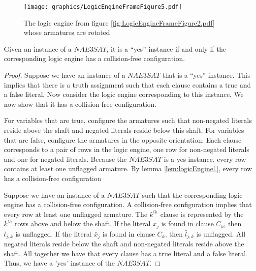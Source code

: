 \begin{figure}[!htbp]
\begin{center}
\texttt{[image: graphics/LogicEngineFrameFigure5.pdf]}
\caption{The logic engine from figure \ref{fig:LogicEngineFrameFigure2.pdf} whose armatures are rotated}\label{fig:LogicEngineFrameFigure5.pdf}
\end{center}
\end{figure}
\begin{thm}\label{thm:Satisfiability-1}
 Given an instance of a $NAE3SAT$,  it is a ``yes'' instance if and only if the 
corresponding logic engine has a collision-free configuration.
\end{thm}
\begin{proof}
Suppose we have an instance of a $NAE3SAT$ that is a ``yes'' instance. This implies that there is a 
truth assignment such that each clause contains a true and a false literal. Now consider the logic 
engine corresponding to this instance. We now 
show that it has a collision free configuration.

For variables that are true, configure the armatures such that non-negated literals reside above the 
shaft and negated literals reside below this shaft.  For variables that are false, configure the 
armatures in the opposite orientation.  Each clause corresponds to a pair of rows in 
the logic engine, one row for non-negated literals and one for negated literals.  Because the 
$NAE3SAT$ is a yes instance, every row contains at least one unflagged armature.  
By lemma \ref{lem:logicEngine1}, every row  has a collision-free configuration

Suppose we have an instance of a $NAE3SAT$ such that the corresponding logic engine has a 
collision-free configuration. A collision-free configuration implies that every row at least one unflagged armature.  The $k^{th}$ clause is represented by the $k^{th}$ rows above and below the shaft. If the literal $x_j$ is found in clause $C_k$, then $l_{j,k}$ is unflagged. If the literal $\bar{x}_j$ is found in clause $C_k$, then $\bar{l}_{j,k}$ is unflagged.  All negated literals reside below the shaft and non-negated literals reside above the shaft.  All together we have that every clause has a true literal and a false literal.  Thus, we have a 'yes' instance of the $NAE3SAT$.



\end{proof}
